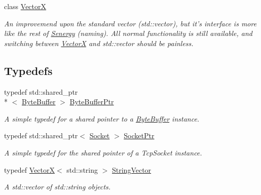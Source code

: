 \begin{DoxyCompactItemize}
class \hyperlink{class_senergy_1_1_vector_x}{Vector\-X}
\begin{DoxyCompactList}\small\item\em An improvemend upon the standard vector (std\-::vector), but it's interface is more like the rest of \hyperlink{namespace_senergy}{Senergy} (naming). All normal functionality is still available, and switching between \hyperlink{class_senergy_1_1_vector_x}{Vector\-X} and std\-::vector should be painless. \end{DoxyCompactList}\end{DoxyCompactItemize}
\subsection*{Typedefs}
\begin{DoxyCompactItemize}
\item 
typedef std\-::shared\-\_\-ptr\\*
$<$ \hyperlink{class_senergy_1_1_byte_buffer}{Byte\-Buffer} $>$ \hyperlink{namespace_senergy_a30f5cfaeb333ffdf2c3332cc590a57ea}{Byte\-Buffer\-Ptr}
\begin{DoxyCompactList}\small\item\em A simple typedef for a shared pointer to a \hyperlink{class_senergy_1_1_byte_buffer}{Byte\-Buffer} instance. \end{DoxyCompactList}\item 
typedef std\-::shared\-\_\-ptr$<$ \hyperlink{class_senergy_1_1_socket}{Socket} $>$ \hyperlink{namespace_senergy_a9014e48a368555ba932efd8d17eb2d23}{Socket\-Ptr}
\begin{DoxyCompactList}\small\item\em A simple typedef for the shared pointer of a Tcp\-Socket instance. \end{DoxyCompactList}\item 
typedef \hyperlink{class_senergy_1_1_vector_x}{Vector\-X}$<$ std\-::string $>$ \hyperlink{namespace_senergy_a09aea2e19671645414361ca8388aebfe}{String\-Vector}
\begin{DoxyCompactList}\small\item\em A std\-::vector of std\-::string objects. \end{DoxyCompactList}\end{DoxyCompactItemize}
